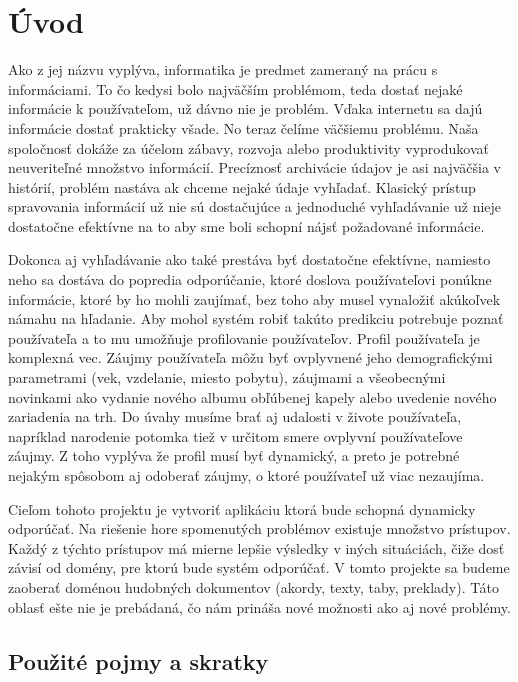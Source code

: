 \newpage 
\section{Úvod}

Ako z jej názvu vyplýva,
informatika je predmet zameraný na prácu s informáciami.
To čo kedysi bolo najväčším problémom,
teda dostať nejaké informácie k používateľom,
už dávno nie je problém. Vďaka internetu sa dajú informácie dostať prakticky všade.
No teraz čelíme väčšiemu problému.
Naša spoločnosť dokáže za účelom zábavy,
rozvoja alebo produktivity vyprodukovať neuveriteľné množstvo informácií.
Precíznosť archivácie údajov je asi najväčšia v histórií,
problém nastáva ak chceme nejaké údaje vyhľadať.
Klasický prístup spravovania informácií už nie sú dostačujúce a
jednoduché vyhľadávanie už nieje dostatočne efektívne na to aby
sme boli schopní nájsť požadované informácie.

Dokonca aj vyhľadávanie ako také prestáva byť dostatočne efektívne,
namiesto neho sa dostáva do popredia odporúčanie,
ktoré doslova používateľovi ponúkne informácie,
ktoré by ho mohli zaujímať, bez toho aby musel vynaložiť akúkoľvek námahu na hľadanie.
Aby mohol systém robiť takúto predikciu potrebuje poznať používateľa a
to mu umožňuje profilovanie používateľov.
Profil používateľa je komplexná vec.
Záujmy používateľa môžu byť ovplyvnené jeho demografickými parametrami
(vek, vzdelanie, miesto pobytu),
záujmami a všeobecnými novinkami ako vydanie nového
albumu obľúbenej kapely alebo uvedenie nového zariadenia na trh.
Do úvahy musíme brať aj udalosti v živote používateľa,
napríklad narodenie potomka tiež v určitom smere ovplyvní používateľove záujmy.
Z toho vyplýva že profil musí byť dynamický,
a preto je potrebné nejakým spôsobom aj odoberať záujmy,
o ktoré používateľ už viac nezaujíma.

Cieľom tohoto projektu je vytvoriť aplikáciu ktorá bude schopná dynamicky odporúčať.
Na riešenie hore spomenutých problémov existuje množstvo prístupov.
Každý z týchto prístupov má mierne lepšie výsledky v iných situáciách,
čiže dosť závisí od domény, pre ktorú bude systém odporúčať.
V tomto projekte sa budeme zaoberať doménou
hudobných dokumentov (akordy, texty, taby, preklady).
Táto oblasť ešte nie je prebádaná,
čo nám prináša nové možnosti ako aj nové problémy.

\newpage
\subsection{Použité pojmy a skratky}

